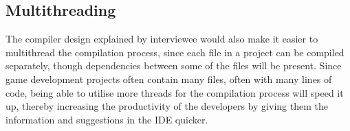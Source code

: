 \subsection{Multithreading}
The compiler design explained by interviewee would also make it easier to multithread the compilation process, since each file in a project can be compiled separately, though dependencies between some of the files will be present.
Since game development projects often contain many files, often with many lines of code, being able to utilise more threads for the compilation process will speed it up, thereby increasing the productivity of the developers by giving them the information and suggestions in the \ac{IDE} quicker.
